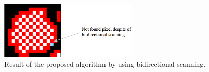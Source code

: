 \documentclass[sensors,article,accept,moreauthors,pdftex,10pt,a4paper]{mdpi}
\begin{document}
\begin{figure}[H]
	\centering
	\includegraphics[width=0.6\textwidth]{5.ExperimentalResult/fig22.png}
	\caption{Result of the proposed algorithm by using bidirectional scanning.}
	\label{fig:image22}
\end{figure}



\end{document}
